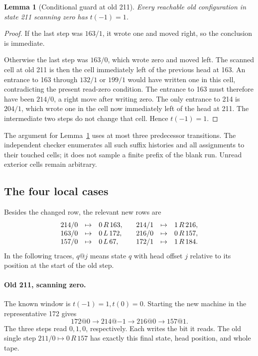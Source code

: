 \documentclass[11pt,letterpaper]{article}
\newcommand{\act}[3]{#1\,#2\,#3}
\newtheorem{lemma}[theorem]{Lemma}
\begin{document}
\begin{lemma}[Conditional guard at old 211]\label{lem:211}
Every reachable old configuration in state 211 scanning zero has
$t(-1)=1$.
\end{lemma}
\begin{proof}
If the last step was $163/1$, it wrote one and moved right, so the conclusion
is immediate.

Otherwise the last step was $163/0$, which wrote zero and moved left.
The scanned cell at old 211 is then the cell immediately left of the
previous head at 163. An entrance to 163 through $132/1$ or $199/1$ would
have written one in this cell, contradicting the present read-zero condition.
The entrance to 163 must therefore have been $214/0$, a right move after
writing zero. The only entrance to 214 is $204/1$, which wrote one in the
cell now immediately left of the head at 211. The intermediate two steps
do not change that cell. Hence $t(-1)=1$.
\end{proof}

The argument for Lemma~\ref{lem:211} uses at most three predecessor
transitions. The independent checker enumerates all such suffix histories
and all assignments to their touched cells; it does not sample a finite
prefix of the blank run. Unread exterior cells remain arbitrary.

\subsection{The four local cases}
Besides the changed row, the relevant new rows are
\[
\begin{array}{rcl@{\qquad}rcl}
214/0&\mapsto&\act0R{163},&
214/1&\mapsto&\act1R{216},\\
163/0&\mapsto&\act0L{172},&
216/0&\mapsto&\act0R{157},\\
157/0&\mapsto&\act0L{67},&
172/1&\mapsto&\act1R{184}.
\end{array}
\]
In the following traces, $q@j$ means state $q$ with head offset $j$
relative to its position at the start of the old step.

\paragraph{Old 211, scanning zero.}
The known window is $t(-1)=1,t(0)=0$. Starting the new machine in the
representative 172 gives
\[
 172@0\longrightarrow214@{-1}\longrightarrow216@0
       \longrightarrow157@1.
\]
The three steps read $0,1,0$, respectively. Each writes the bit it reads.
The old single step $211/0\mapsto\act0R{157}$ has exactly this final
state, head position, and whole tape.
\end{document}

